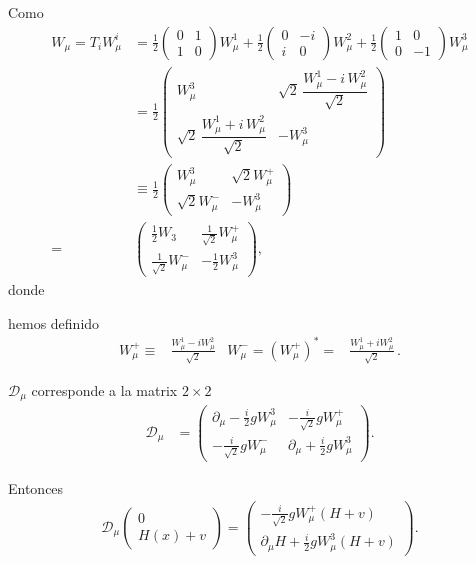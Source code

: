 Como
\begin{align}
\label{eq:w22}
      W_\mu=T_i W^{i}_\mu&=
  \frac{1}{2}\begin{pmatrix}
    0&1\\
    1&0
  \end{pmatrix}W^1_\mu+
  \frac{1}{2}\begin{pmatrix}
    0&-i\\
    i&0
  \end{pmatrix}W^2_\mu+
  \frac{1}{2}\begin{pmatrix}
    1&0\\
    0&-1
  \end{pmatrix}W^3_\mu\nonumber\\
  &=
  \frac{1}{2}\begin{pmatrix}
    W^3_\mu                                  &\sqrt{2}\,\dfrac{W^1_\mu-i\,W^2_\mu}{\sqrt{2}}\\
    \sqrt{2}\,\dfrac{W^1_\mu+i\,W^2_\mu}{\sqrt{2}} &-W^3_\mu
  \end{pmatrix}\nonumber\\
  &\equiv
  \frac{1}{2}\begin{pmatrix}
    W^3_\mu&\sqrt{2}W^+_\mu\\
    \sqrt{2}W^-_\mu&-W^3_\mu
  \end{pmatrix}\nonumber\\
=&\begin{pmatrix}
    \frac{1}{2}W_3&\frac{1}{\sqrt{2}}W^+_\mu\\
    \frac{1}{\sqrt{2}}W^-_\mu&-\frac{1}{2}W^3_\mu
  \end{pmatrix},
\end{align}
donde
\begin{frame}
hemos definido
\begin{align}
  W_{\mu}^{+}\equiv& \frac{W_{\mu}^1-i W_{\mu}^2}{\sqrt{2}} & 
  W_{\mu}^{-}=\left( W_{\mu}^{+} \right)^{*}=& \frac{W_{\mu}^1+i W_{\mu}^2}{\sqrt{2}}\,. 
\end{align}

$\mathcal{D}_\mu$ corresponde a la matrix $2\times  2$
\begin{align}
\label{eq:d22}
 \mathcal{D}_\mu &=  \begin{pmatrix}
    \partial_\mu-\frac{i}{2}g W^3_\mu&-\frac{i}{\sqrt{2}}g W^+_\mu\\
    -\frac{i}{\sqrt{2}}g W^-_\mu&\partial_\mu+\frac{i}{2}g W^3_\mu
  \end{pmatrix}.
\end{align}
\end{frame}
Entonces
\begin{align}
\mathcal{D}_\mu \begin{pmatrix}
    0\\
    H(x)+v
  \end{pmatrix}=\begin{pmatrix}
    -\frac{i}{\sqrt{2}}gW_\mu^+(H+v)\\
    \partial_\mu H+\frac{i}{2}gW^3_\mu(H+v)
  \end{pmatrix}.
\end{align}

